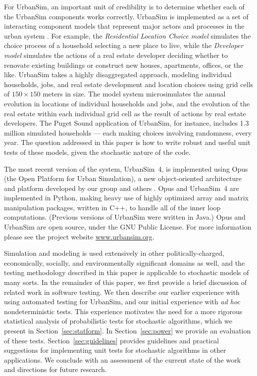 \documentclass{sig-alternate}
\begin{document}
For UrbanSim, an important unit of credibility is to determine whether each
of the UrbanSim components works correctly.  UrbanSim is implemented as a
set of interacting component models that represent major actors and
processes in the urban system \cite{noth-ceus-2003}.  For example, the
\emph{Residential Location Choice model} simulates the choice process of a
household selecting a new place to live, while the \emph{Developer model}
simulates the actions of a real estate developer deciding whether to
renovate existing buildings or construct new houses, apartments, offices,
or the like.  UrbanSim takes a highly disaggregated approach, modeling
individual households, jobs, and real estate development and location
choices using grid cells of $150\times 150$ meters in size.  The model
system microsimulates the annual evolution in locations of individual
households and jobs, and the evolution of the real estate within each
individual grid cell as the result of actions by real estate developers.
The Puget Sound application of UrbanSim, for instance, includes 1.3 million
simulated households --- each making choices involving randomness, every
year.  The question addressed in this paper is how to write robust and
useful unit tests of these models, given the stochastic nature of the code.

The most recent version of the system, UrbanSim~4, is implemented using
Opus (the Open Platform for Urban Simulation), a new object-oriented
architecture and platform developed by our group and others
\cite{waddell-opus-2005}.  Opus and UrbanSim~4 are implemented in Python,
making heavy use of highly optimized array and matrix manipulation
packages, written in C++, to handle all of the inner loop computations.
(Previous versions of UrbanSim 
were written in Java.)  Opus and UrbanSim are open source, under
the GNU Public License.  For more information please see the project
website \url{www.urbansim.org}.

Simulation and modeling is used extensively in other politically-charged,
economically, socially, and environmentally significant domains as well,
and the testing methodology described in this paper is applicable to
stochastic models of many sorts.  In the remainder of this paper, we first
provide a brief discussion of related work in software testing.  We then
describe our earlier experience with using automated testing for UrbanSim,
and our initial experience with \emph{ad hoc} nondeterministic tests.  This
experience motivates the need for a more rigorous statistical analysis of
probabilistic tests for stochastic algorithms, which we present in
Section~\ref{sec:statform}.  In Section~\ref{sec:power} we provide an
evaluation of these tests.  Section~\ref{sec:guidelines} provides
guidelines and practical suggestions for implementing unit tests for
stochastic algorithms in other applications.  We conclude with an
assessment of the current state of the work and directions for future
research.
\end{document}
